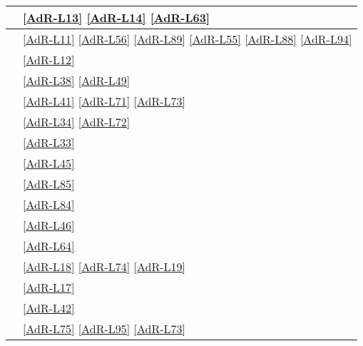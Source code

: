 \begin{longtable}{|>{\centering}P{7cm}|>{\centering}P{5cm}|}
	\hline {} & \ref{AdR-L13} \linebreak \ref{AdR-L14} \linebreak \ref{AdR-L63} \tabularnewline
	\hline {} & \ref{AdR-L11} \linebreak \ref{AdR-L56} \linebreak \ref{AdR-L89} \linebreak \ref{AdR-L55} \linebreak \ref{AdR-L88} \linebreak \ref{AdR-L94} \tabularnewline
	\hline {} & \ref{AdR-L12} \tabularnewline
	\hline {} & \ref{AdR-L38} \linebreak \ref{AdR-L49} \tabularnewline
	\hline {} & \ref{AdR-L41} \linebreak \ref{AdR-L71} \linebreak \ref{AdR-L73} \tabularnewline
	\hline {} & \ref{AdR-L34} \linebreak \ref{AdR-L72} \tabularnewline
	\hline {} & \ref{AdR-L33} \tabularnewline
	\hline {} & \ref{AdR-L45} \tabularnewline
	\hline {} & \ref{AdR-L85} \tabularnewline
	\hline {} & \ref{AdR-L84} \tabularnewline
	\hline {} & \ref{AdR-L46} \tabularnewline
	\hline {} & \ref{AdR-L64} \tabularnewline
	
	\hline {} & \ref{AdR-L18} \linebreak \ref{AdR-L74} \linebreak \ref{AdR-L19} \tabularnewline
	\hline {} & \ref{AdR-L17} \tabularnewline
	\hline {} & \ref{AdR-L42} \tabularnewline
	\hline {} & \ref{AdR-L75} \linebreak \ref{AdR-L95} \linebreak \ref{AdR-L73} \tabularnewline
	

\end{longtable}
